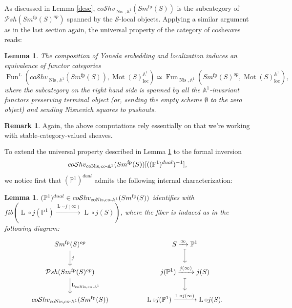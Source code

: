 \documentclass{article}
\newtheorem{lm}[thm]{Lemma}
\theoremstyle{definition}
\newtheorem{rmk}[thm]{Remark}
\newcommand{\on}{\operatorname}
\begin{document}
As discussed in Lemma \ref{desc}, $co\mathcal{S}hv_{\on{Nis},\mathbb{A}^1}(Sm^{\on{fp}}(S))$ is the subcategory of $\mathcal{P}sh(Sm^{\on{fp}}(S)^{op})$ spanned by the $\mathcal{S}$-local objects. Applying a similar argument as in the last section again, the universal property of the category of cosheaves reads:
\begin{lm}\label{coShv.universal.property}
The composition of Yoneda embedding and localization induces an equivalence of functor categories\[
\on{Fun}^{L}(co\mathcal{S}hv_{\on{Nis},\mathbb{A}^1}(Sm^{\on{fp}}(S)), \on{Mot}(S)_{\on{loc}}^{\mathbb{A}^1})\simeq\on{Fun}_{\on{Nis},\mathbb{A}^1}(Sm^{\on{fp}}(S)^{op},\on{Mot}(S)_{\on{loc}}^{\mathbb{A}^1}),\]
where the subcategory on the right hand side is spanned by all the $\mathbb{A}^1$-invariant functors preserving terminal object (or, sending the empty scheme $\emptyset$ to the zero object) and sending Nisnevich squares to pushouts.
\end{lm}
\begin{rmk}
Again, the above computations rely essentially on that we're working with stable-category-valued sheaves.
\end{rmk}
To extend the universal property described in Lemma \ref{coShv.universal.property} to the formal inversion 
\[co\mathcal{S}hv_{\on{coNis},co{\text -}\mathbb{A}^1}(Sm^{\on{fp}}(S))[((\mathbb{P}^1)^{dual})^{-1}],\] we notice first that $(\mathbb{P}^1)^{dual}$ admits the following internal characterization:
\begin{lm}\label{description}
$(\mathbb{P}^1)^{dual}\in co\mathcal{S}hv_{\on{coNis},co{\text -}\mathbb{A}^1}(Sm^{\on{fp}}(S))$ identifies with $fib(\on{L}\circ j(\mathbb{P}^1)\xrightarrow{\on{L}\circ j(\infty)}\on{L}\circ j(S))$, where the fiber is induced as in the following diagram:
\[\begin{tikzcd}
	{Sm^{\operatorname{fp}}(S)^{op}} && {S\xrightarrow{\infty}\mathbb{P}^1} \\
	{\mathcal{P}sh(Sm^{\operatorname{fp}}(S)^{op})} && {j(\mathbb{P}^1)\xrightarrow{j(\infty)}j(S)} \\
	{co\mathcal{S}hv_{\operatorname{coNis},co{\text -}\mathbb{A}^1}(Sm^{\operatorname{fp}}(S))} && {\operatorname{L}\circ j(\mathbb{P}^1)\xrightarrow{\operatorname{L}\circ j(\infty)}\operatorname{L}\circ j(S)}
	\arrow["j", from=1-1, to=2-1]
	\arrow[maps to, from=1-3, to=2-3]
	\arrow["{\operatorname{L}_{\operatorname{coNis},\operatorname{co}{\text -}\mathbb{A}^1}}", from=2-1, to=3-1]
	\arrow[maps to, from=2-3, to=3-3].
\end{tikzcd}\]
\end{lm}
\end{document}
